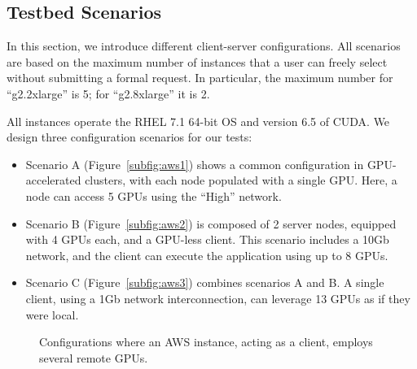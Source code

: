 \documentclass[a4paper,twoside]{article}
\begin{document}
\subsection{Testbed Scenarios}
In this section, we introduce different client-server configurations. 
All scenarios are based on the maximum number of instances 
that a user can freely select without submitting a formal request. 
In particular, the maximum number for ``g2.2xlarge'' is 5; for ``g2.8xlarge'' it is 2.

All instances operate the RHEL 7.1 64-bit OS and version 6.5 of CUDA. 
We design three configuration scenarios for our tests:

\begin{itemize}
\item Scenario A (Figure~\ref{subfig:aws1}) shows a common 
configuration in GPU-accelerated clusters, with each node  
populated with a single GPU. Here, a node can access 5 GPUs 
using the ``High'' network. 

\item Scenario B (Figure~\ref{subfig:aws2}) is composed of 2 server nodes, equipped 
with 4 GPUs each, and a GPU-less client. This scenario includes 
a 10Gb network, and the client can execute the application using up to 8 GPUs.

\item Scenario C (Figure~\ref{subfig:aws3}) combines scenarios A and B. A 
single client, using a 1Gb network interconnection, can leverage 13 GPUs as if they were local.
\end{itemize}

\begin{figure}[ht]
\centering
{}
\quad
{}
\caption{Configurations where an AWS instance, acting as a client, employs several remote GPUs.}
\label{fig:aws}
\end{figure}
\end{document}
